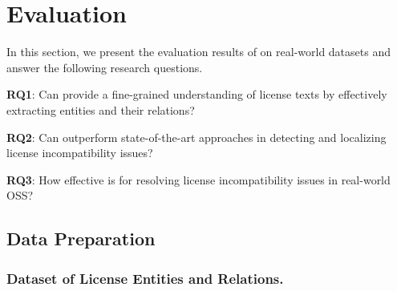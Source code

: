 \section{Evaluation} \label{sec:evaluation}


In this section, we present the evaluation results of \tool on real-world datasets and answer the following research questions. %

    \textbf{RQ1}: Can \tool provide a fine-grained understanding of license texts by effectively extracting entities and their relations?
    
    \textbf{RQ2}: Can \tool outperform state-of-the-art approaches in detecting and localizing license incompatibility issues?
    
    \textbf{RQ3}: How effective is \tool for resolving license incompatibility issues in real-world OSS?


\iffalse 

\subsection{Data Preparation}


\subsubsection{\textbf{Dataset of License Entities and Relations.}}

